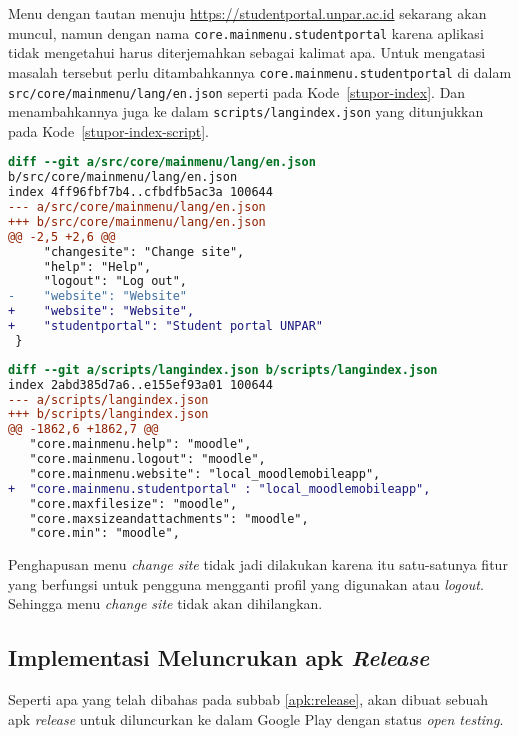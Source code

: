 Menu dengan tautan menuju \url{https://studentportal.unpar.ac.id} sekarang akan muncul, namun dengan nama \texttt{core.mainmenu.studentportal} karena aplikasi tidak mengetahui harus diterjemahkan sebagai kalimat apa. Untuk mengatasi masalah tersebut perlu ditambahkannya \texttt{core.mainmenu.studentportal} di dalam \texttt{src/core/mainmenu/lang/en.json} seperti pada \mbox{Kode \ref{stupor-index}}. Dan menambahkannya juga ke dalam \texttt{scripts/langindex.json} yang ditunjukkan pada  \mbox{Kode \ref{stupor-index-script}}.

\begin{lstlisting}[language=diff, frame=single, label ={stupor-index}, caption = Menambahkan \texttt{core.mainmenu.studentportal} pada file  \texttt{src/core/mainmenu/lang/en.json} ]
diff --git a/src/core/mainmenu/lang/en.json 
b/src/core/mainmenu/lang/en.json
index 4ff96fbf7b4..cfbdfb5ac3a 100644
--- a/src/core/mainmenu/lang/en.json
+++ b/src/core/mainmenu/lang/en.json
@@ -2,5 +2,6 @@
     "changesite": "Change site",
     "help": "Help",
     "logout": "Log out",
-    "website": "Website"
+    "website": "Website", 
+    "studentportal": "Student portal UNPAR"
 }
\end{lstlisting} 

\begin{lstlisting}[language=diff, frame=single, label ={stupor-index-script}, caption = Menambahkan \texttt{core.mainmenu.studentportal} pada file  \texttt{scripts/langindex.json} ]
diff --git a/scripts/langindex.json b/scripts/langindex.json
index 2abd385d7a6..e155ef93a01 100644
--- a/scripts/langindex.json
+++ b/scripts/langindex.json
@@ -1862,6 +1862,7 @@
   "core.mainmenu.help": "moodle",
   "core.mainmenu.logout": "moodle",
   "core.mainmenu.website": "local_moodlemobileapp",
+  "core.mainmenu.studentportal" : "local_moodlemobileapp",
   "core.maxfilesize": "moodle",
   "core.maxsizeandattachments": "moodle",
   "core.min": "moodle",
\end{lstlisting} 

Penghapusan menu \textit{change site} tidak jadi dilakukan karena itu satu-satunya fitur yang berfungsi untuk pengguna mengganti profil yang digunakan atau \textit{logout}. Sehingga menu \textit{change site} tidak akan dihilangkan.

\subsection{Implementasi Meluncrukan apk \textit{Release}}
Seperti apa yang telah dibahas pada subbab \ref{apk:release}, akan dibuat sebuah apk \textit{release} untuk diluncurkan ke dalam Google Play dengan status \textit{open testing}. 

